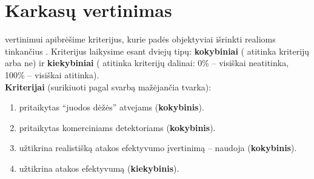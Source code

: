 \section{Karkasų vertinimas}\label{sec:criteria}

 vertinimui apibrėšime kriterijus, kurie padės objektyviai išrinkti
realioms  tinkančius . Kriterijus
laikysime esant dviejų tipų: \textbf{kokybiniai} ( atitinka
kriterijų arba ne) ir \textbf{kiekybiniai} ( atitinka
kriterijų dalinai: 0\% -- visiškai neatitinka, 100\% -- visiškai atitinka). \\

\textbf{Kriterijai} (surikiuoti pagal svarbą mažėjančia tvarka):
\vspace{-5pt}
\begin{enumerate}[label=K-\arabic*., ref=K-\arabic*]
    \item {} pritaikytas \enquote{juodos dėžės} atvejams (\textbf{kokybinis}).\label{enum:criteria:blackbox}
    \item {} pritaikytas komerciniams detektoriams (\textbf{kokybinis}).\label{enum:criteria:commercial}
    \item {} užtikrina realistišką atakos efektyvumo įvertinimą -- naudoja  (\textbf{kokybinis}).\label{enum:criteria:surrogate}
    \item {} užtikrina atakos efektyvumą (\textbf{kiekybinis}).\label{enum:criteria:effective}
\end{enumerate}

\newenvironment{criteriaTable}{
    \newcommand{\rowLast}[1]{##1}
    \newcommand{\row}[1]{##1 \\}
    \newcommand{\tbl}[1]{\gdef\Table{##1}}

    \def\Table{}
}{
    \begin{table}[h]
        \centering
        \begin{tabular}{|l|c|c|c|S|}
            \row{
            \textbf{\Glsshort{framework}}           &
            \textbf{\ref{enum:criteria:blackbox}}   &
            \textbf{\ref{enum:criteria:commercial}} &
            \textbf{\ref{enum:criteria:surrogate}}  &
                \textbf{\ref{enum:criteria:effective}}
            } \midrule
            \Table{}
        \end{tabular}
        \caption{\Glsplwhom{framework} vertinimas pagal kriterijus. \Glspl{framework} surikiuoti pagal įvertinimą mažėjančia tvarka.}
    \end{table}
}

